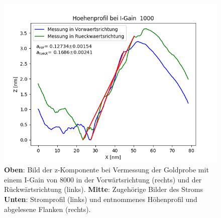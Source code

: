 \documentclass[12pt,a4paper]{article}
\begin{document}
\begin{figure}[H]
\includegraphics[scale=0.5]{Bilder/Anhang/IGain/Profil_IGain_1000.png}
\caption{\textbf{Oben}: Bild der z-Komponente bei Vermessung der Goldprobe mit einem I-Gain von 8000 in der Vorwärtsrichtung (rechts) und der Rückwärtsrichtung (links). \textbf{Mitte}: Zugehörige Bilder des Stroms \textbf{Unten}: Stromprofil (links) und entnommenes Höhenprofil und abgelesene Flanken (rechts).}
\end{figure}
\end{document}
